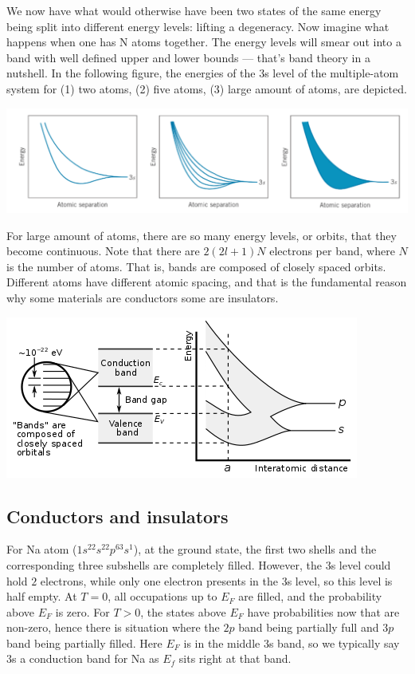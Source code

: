 \documentclass[11pt]{article}
\theoremstyle{break}
\theoremstyle{break}
\begin{document}
We now have what would otherwise have been two states of the same energy being split into different energy levels: lifting a degeneracy. Now imagine what happens when one has N atoms together. The energy levels will smear out into a band with well defined upper and lower bounds — that's band theory in a nutshell. In the following figure, the energies of the 3s level of the multiple-atom system for (1) two atoms, (2) five atoms, (3) large amount of atoms, are depicted.
\begin{center}
\includegraphics[scale=0.68]{bandStruc}
\end{center}
For large amount of atoms, there are so many energy levels, or orbits, that they become continuous. Note that there are $2(2l+1)N$ electrons per band, where $N$ is the number of atoms. That is, bands are composed of closely spaced orbits. Different atoms have different atomic spacing, and that is the fundamental reason why some materials are conductors some are insulators.
\begin{center}
\includegraphics[scale=0.8]{BandGap}
\end{center}

\subsection{Conductors and insulators}
For Na atom ($1s^22s^22p^63s^1$), at the ground state, the first two shells and the corresponding three subshells are completely filled. However, the 3s level could hold $2$ electrons, while only one electron presents in the 3s level, so this level is half empty. At $T=0$, all occupations up to $E_F$ are filled, and the probability above $E_F$ is zero. For $T> 0$, the states above $E_F$  have probabilities now that are non-zero, hence there is situation where the $2p$ band being partially full and $3p$ band being partially filled. Here $E_F$ is in the middle 3s band, so we typically say 3s a conduction band for Na as $E_f$ sits right at that band.\\
\end{document}
